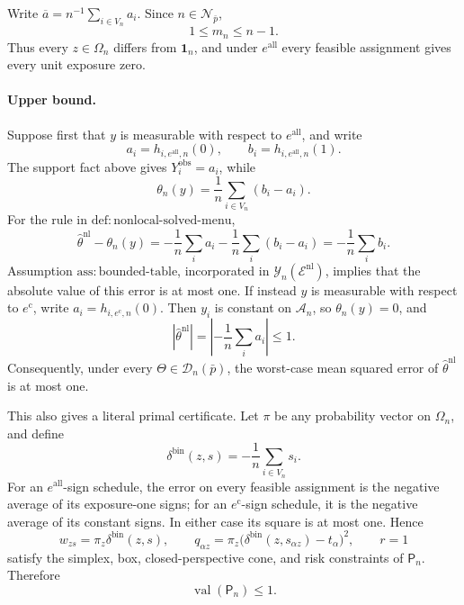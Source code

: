 Write \(\overline a=n^{-1}\sum_{i\in V_n}a_i\).  Since \(n\in\mathcal N_{\bar p}\),
\[
 1\le m_n\le n-1.
\]
Thus every \(z\in\Omega_n\) differs from \(\mathbf 1_n\), and under \(e^{\mathrm{all}}\) every feasible assignment gives every unit exposure zero.

\paragraph{Upper bound.}
Suppose first that \(y\) is measurable with respect to \(e^{\mathrm{all}}\), and write
\[
 a_i=h_{i,e^{\mathrm{all}},n}(0),\qquad
 b_i=h_{i,e^{\mathrm{all}},n}(1).
\]
The support fact above gives \(Y_i^{\mathrm{obs}}=a_i\), while
\[
 \theta_n(y)=\frac1n\sum_{i\in V_n}(b_i-a_i).
\]
For the rule in \(\mathrm{def{:}nonlocal\text{-}solved\text{-}menu}\),
\[
 \widehat\theta^{\mathrm{nl}}-\theta_n(y)
 =-\frac1n\sum_i a_i-\frac1n\sum_i(b_i-a_i)
 =-\frac1n\sum_i b_i.
\]
Assumption \(\mathrm{ass{:}bounded\text{-}table}\), incorporated in \(\mathcal Y_n(\mathcal E^{\mathrm{nl}})\), implies that the absolute value of this error is at most one.  If instead \(y\) is measurable with respect to \(e^{\mathrm c}\), write \(a_i=h_{i,e^{\mathrm c},n}(0)\).  Then \(y_i\) is constant on \(\mathcal A_n\), so \(\theta_n(y)=0\), and
\[
 \left|\widehat\theta^{\mathrm{nl}}\right|
 =\left|-\frac1n\sum_i a_i\right|\le1.
\]
Consequently, under every \(\Theta\in\mathcal D_n(\bar p)\), the worst-case mean squared error of \(\widehat\theta^{\mathrm{nl}}\) is at most one.

This also gives a literal primal certificate.  Let \(\pi\) be any probability vector on \(\Omega_n\), and define
\[
 \delta^{\mathrm{bin}}(z,s)=-\frac1n\sum_{i\in V_n}s_i.
\]
For an \(e^{\mathrm{all}}\)-sign schedule, the error on every feasible assignment is the negative average of its exposure-one signs; for an \(e^{\mathrm c}\)-sign schedule, it is the negative average of its constant signs.  In either case its square is at most one.  Hence
\[
 w_{zs}=\pi_z\delta^{\mathrm{bin}}(z,s),\qquad
 q_{\alpha z}=\pi_z\bigl(\delta^{\mathrm{bin}}(z,s_{\alpha z})-t_\alpha\bigr)^2,
 \qquad r=1
\]
satisfy the simplex, box, closed-perspective cone, and risk constraints of \(\mathsf P_n\).  Therefore
\[
 \operatorname{val}(\mathsf P_n)\le1.
\]

